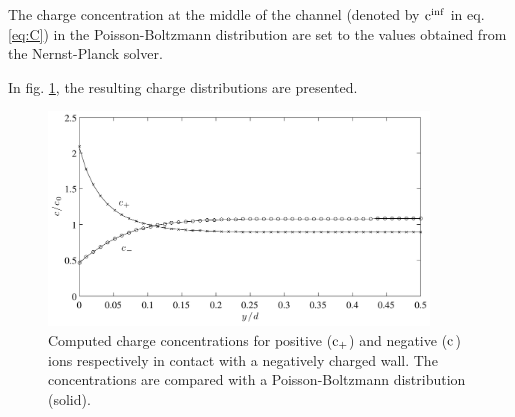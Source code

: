 The charge concentration at the middle of the channel (denoted by
$\mathrm{c}^{\inf}$ in eq. \eqref{eq:C}) in the Poisson-Boltzmann distribution
are set to the values obtained from the Nernst-Planck solver. 

In fig. \ref{fig:mb:np}, the resulting charge distributions are
presented.  

\begin{figure}
\begin{center}
\includegraphics[width=0.9\textwidth]{fig/np_bench.pdf}
\end{center}
\caption{Computed charge concentrations for positive ($\mathrm{c}_+$) and
  negative ($\mathrm{c}_{\-}$) ions respectively in contact with a negatively
  charged wall. The concentrations are compared with a
  Poisson-Boltzmann distribution (solid).}
\label{fig:mb:np}
\end{figure}


